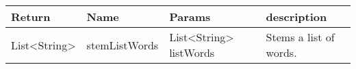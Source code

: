\begin{tabular}{p{}p{}p{}p{}} 
	\hline \hline
	
	Return & Name & Params & description \\
	
	\hline\hline

	List<String> & stemListWords & List<String> listWords & 
	Stems a list of words. \\
	\hline \hline
\end{tabular}